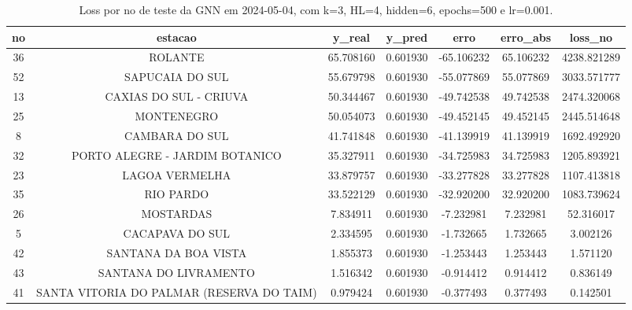 \begin{table}[h]
\centering
\caption{Loss por no de teste da GNN em 2024-05-04, com k=3, HL=4, hidden=6, epochs=500 e lr=0.001.}
\label{tab:gnn_loss_k3_hl4_h6_e500_d20240504}
\begin{tabular}{ccccccc}
\toprule
no & estacao & y\_real & y\_pred & erro & erro\_abs & loss\_no \\
\midrule
36 & ROLANTE & 65.708160 & 0.601930 & -65.106232 & 65.106232 & 4238.821289 \\
52 & SAPUCAIA DO SUL & 55.679798 & 0.601930 & -55.077869 & 55.077869 & 3033.571777 \\
13 & CAXIAS DO SUL - CRIUVA & 50.344467 & 0.601930 & -49.742538 & 49.742538 & 2474.320068 \\
25 & MONTENEGRO & 50.054073 & 0.601930 & -49.452145 & 49.452145 & 2445.514648 \\
8 & CAMBARA DO SUL & 41.741848 & 0.601930 & -41.139919 & 41.139919 & 1692.492920 \\
32 & PORTO ALEGRE - JARDIM BOTANICO & 35.327911 & 0.601930 & -34.725983 & 34.725983 & 1205.893921 \\
23 & LAGOA VERMELHA & 33.879757 & 0.601930 & -33.277828 & 33.277828 & 1107.413818 \\
35 & RIO PARDO & 33.522129 & 0.601930 & -32.920200 & 32.920200 & 1083.739624 \\
26 & MOSTARDAS & 7.834911 & 0.601930 & -7.232981 & 7.232981 & 52.316017 \\
5 & CACAPAVA DO SUL & 2.334595 & 0.601930 & -1.732665 & 1.732665 & 3.002126 \\
42 & SANTANA DA BOA VISTA & 1.855373 & 0.601930 & -1.253443 & 1.253443 & 1.571120 \\
43 & SANTANA DO LIVRAMENTO & 1.516342 & 0.601930 & -0.914412 & 0.914412 & 0.836149 \\
41 & SANTA VITORIA DO PALMAR (RESERVA DO TAIM) & 0.979424 & 0.601930 & -0.377493 & 0.377493 & 0.142501 \\
\bottomrule
\end{tabular}
\end{table}
